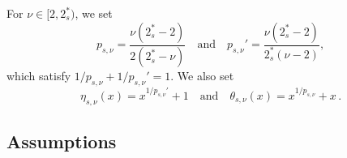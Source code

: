 \documentclass[12pt,a4paper]{amsart}
\numberwithin{equation}{section}
\newcommand{\twoasts}{{2^*_s}}
\newcommand{\psnu}{p_{s,\nu}}
\newcommand{\thetasnu}{\theta_{s,\nu}}
\begin{document}
	For $\nu\in[2,\twoasts)$, we set
	\begin{equation}\label{eq:psnu}
		\psnu=\frac{\nu(\twoasts -2)}{2(\twoasts -\nu)}\quad\text{and}\quad\psnu'=\frac{\nu(\twoasts -2)}{\twoasts (\nu-2)},
	\end{equation}
	which satisfy $1/\psnu+1/\psnu'=1$.
	We also set
	\begin{equation}\label{eq:eta-thetasnu}
		\eta_{s,\nu}(x)=x^{1/\psnu'}+1 \quad\text{and}\quad \thetasnu (x)=x^{1/\psnu}+x\,.%
	\end{equation}
	
	
	\subsection{Assumptions}
	
\end{document}
